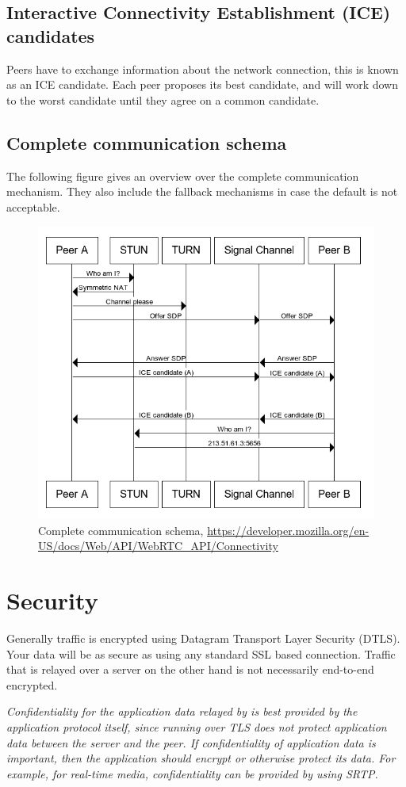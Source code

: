\subsection{Interactive Connectivity Establishment (ICE) candidates}
Peers have to exchange information about the network connection, this is known as an ICE candidate. Each peer proposes its best candidate, and will work down to the worst candidate until they agree on a common candidate.

\subsection{Complete communication schema}
The following figure gives an overview over the complete communication mechanism. They also include the fallback mechanisms in case the default is not acceptable.

\begin{figure}[H]
	\includegraphics[scale=0.5]{images/webrtc-complete-diagram.png}
	\centering
	\caption{ Complete communication schema, \url{https://developer.mozilla.org/en-US/docs/Web/API/WebRTC_API/Connectivity}}
	\label{fig:WebRTC}
\end{figure}

\section{Security}
Generally  traffic is encrypted using Datagram Transport Layer Security (DTLS). Your data will be as secure as using any standard SSL based connection. Traffic that is relayed over a  server on the other hand is not necessarily end-to-end encrypted.

\textit{Confidentiality for the application data relayed by  is best provided by the application protocol itself, since running  over TLS does not protect application data between the server and the peer. If confidentiality of application data is important, then the application should encrypt or otherwise protect its data. For example, for real-time media, confidentiality can be provided by using SRTP.}~\cite{TURN:sec}
